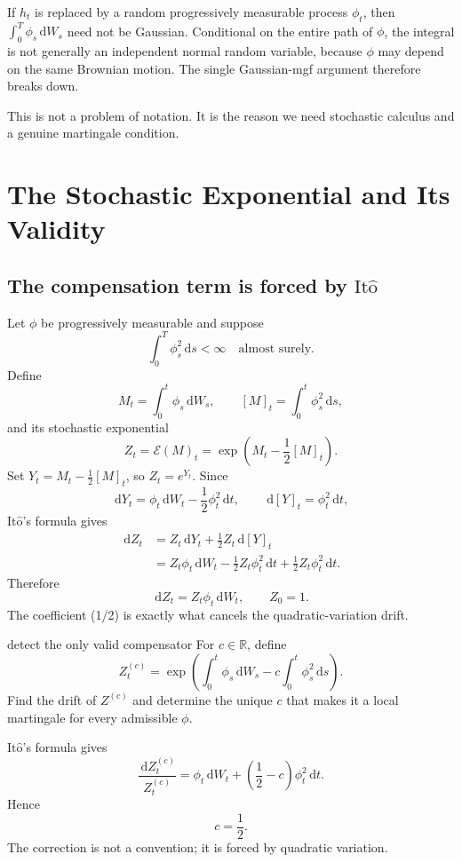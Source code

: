 \documentclass[10pt]{article}
\newcommand{\R}{\mathbb R}
\newcommand{\1}{\mathbf 1}
\newcommand{\dd}{\,\mathrm d}
\newcommand{\Ito}{\mathrm{It\hat{o}}}
\theoremstyle{definition}
\begin{document}
If \(h_t\) is replaced by a random progressively measurable process
\(\phi_t\), then \(\int_0^T\phi_s\dd W_s\) need not be Gaussian. Conditional
on the entire path of \(\phi\), the integral is not generally an independent
normal random variable, because \(\phi\) may depend on the same Brownian
motion. The single Gaussian-mgf argument therefore breaks down.

This is not a problem of notation. It is the reason we need stochastic
calculus and a genuine martingale condition.

\section{The Stochastic Exponential and Its Validity}

\subsection{The compensation term is forced by \texorpdfstring{\(\Ito\)}{Ito}}

Let \(\phi\) be progressively measurable and suppose
\[
\int_0^T\phi_s^2\dd s<\infty
\quad\text{almost surely}.
\]
Define
\[
M_t=\int_0^t\phi_s\dd W_s,
\qquad
[M]_t=\int_0^t\phi_s^2\dd s,
\]
and its stochastic exponential
\[
\boxed{
Z_t=\mathcal E(M)_t
=\exp\!\left(M_t-\frac12[M]_t\right).}
\]
Set \(Y_t=M_t-\tfrac12[M]_t\), so \(Z_t=e^{Y_t}\). Since
\[
\dd Y_t=\phi_t\dd W_t-\frac12\phi_t^2\dd t,
\qquad
\dd[Y]_t=\phi_t^2\dd t,
\]
\(\Ito\)'s formula gives
\[
\begin{aligned}
\dd Z_t
&=Z_t\dd Y_t+\frac12Z_t\dd[Y]_t\\
&=Z_t\phi_t\dd W_t
-\frac12Z_t\phi_t^2\dd t
+\frac12Z_t\phi_t^2\dd t.
\end{aligned}
\]
Therefore
\[
\boxed{\dd Z_t=Z_t\phi_t\dd W_t,\qquad Z_0=1.}
\]
The coefficient (1/2) is exactly what cancels the quadratic-variation
drift.

\begin{studentexercise}{detect the only valid compensator}
For \(c\in\R\), define
\[
Z_t^{(c)}=\exp\!\left(
\int_0^t\phi_s\dd W_s-c\int_0^t\phi_s^2\dd s
\right).
\]
Find the drift of \(Z^{(c)}\) and determine the unique \(c\) that makes it a
local martingale for every admissible \(\phi\).
\end{studentexercise}
\begin{shortsolution}
\(\Ito\)'s formula gives
\[
\frac{\dd Z_t^{(c)}}{Z_t^{(c)}}
=\phi_t\dd W_t+\left(\frac12-c\right)\phi_t^2\dd t.
\]
Hence
\[
\boxed{c=\frac12.}
\]
The correction is not a convention; it is forced by quadratic variation.
\end{shortsolution}
\end{document}

